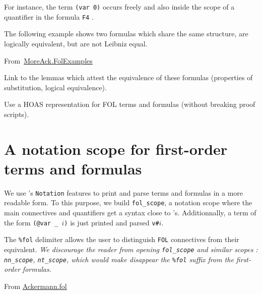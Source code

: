 For instance, the term \texttt{(var 0)}
occurs freely and also inside the scope of a quantifier in the
formula \texttt{F4} .

The following example shows two formulas which share the same structure, are logically equivalent, but are not Leibniz equal.



\vspace{4pt}

\noindent From~\href{../theories/html/hydras.MoreAck.FolExamples.html}{MoreAck.FolExamples}
  


  \begin{todo}
   Link to the lemmas which attest the equivalence of these formulas (properties of substitution, logical equivalence).
  \end{todo}


  \begin{project}
 Use a HOAS representation for FOL terms and formulas (without breaking proof scripts).   
  \end{project}



\section{A notation scope for first-order terms and formulas}
\label{sect:fol-notations}


 We use \coq's \texttt{Notation} features to print and parse terms and formulas  in a more readable form.
To this purpose, we build \texttt{fol\_scope}, a  notation scope
where the main connectives and quantifiers get a syntax close to \coq's.  Additionnally, a term of the form \texttt{(@var \_ $i$)} is
just printed and parsed  \texttt{v\#$i$}.



The \texttt{\%fol} delimiter 
allows the user to distinguish \texttt{FOL} connectives from their \coq equivalent.
\emph{We discourage the reader from \emph{opening} \texttt{fol\_scope} and similar scopes : \texttt{nn\_scope}, \texttt{nt\_scope}, which would make disappear the \texttt{\%fol} suffix from the first-order formulas}.


\vspace{6pt}

\noindent From \href{../theories/html/hydras.Ackermann.fol.html}{Ackermann.fol}

